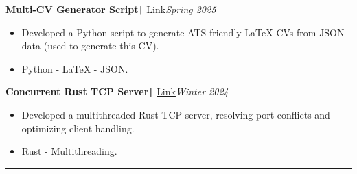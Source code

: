 \documentclass[11pt,a4paper]{article}
\begin{document}
\vspace{-0.3cm}
\begin{flushleft}
\textbf{Multi-CV Generator Script}\texttt{|} {\href{https://github.com/salah0eldin/CV}{Link}}\hfill\textit{Spring 2025}\\
\end{flushleft}
\vspace{-0.6cm}
\begin{itemize}
\item \setlength{\itemsep}{-0.0em} Developed a Python script to generate ATS-friendly LaTeX CVs from JSON data (used to generate this CV).
\item \setlength{\itemsep}{-0.0em} Python - LaTeX - JSON.
\end{itemize}
\vspace{-0.3cm}
\begin{flushleft}
\textbf{Concurrent Rust TCP Server}\texttt{|} {\href{https://github.com/salah0eldin/RustTCPServer}{Link}}\hfill\textit{Winter 2024}\\
\end{flushleft}
\vspace{-0.6cm}
\begin{itemize}
\item \setlength{\itemsep}{-0.0em} Developed a multithreaded Rust TCP server, resolving port conflicts and optimizing client handling.
\item \setlength{\itemsep}{-0.0em} Rust - Multithreading.
\end{itemize}
\vspace{-0.3cm}
\vspace{-0.2cm}
\rule{\textwidth}{0.3pt}\\
\newpage
\vspace{-0.5cm}
\centering
\end{document}
